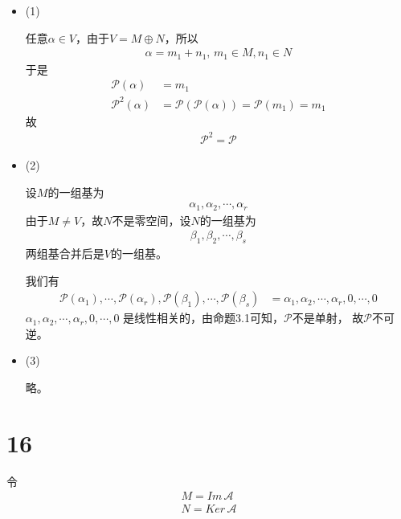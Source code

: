 \documentclass{article}
\begin{document}
\begin{itemize}
  \item (1)

        任意$\alpha \in V$，由于$V = M \oplus N$，所以
        \begin{align*}
          \alpha = m_1 + n_1 , \, m_1 \in M, n_1 \in N
        \end{align*}
        于是
        \begin{align*}
          \mathscr{P}(\alpha)   & = m_1                                                       \\
          \mathscr{P}^2(\alpha) & = \mathscr{P}(\mathscr{P}(\alpha)) = \mathscr{P}(m_1) = m_1
        \end{align*}
        故
        \begin{align*}
          \mathscr{P}^2 = \mathscr{P}
        \end{align*}

  \item (2)

        设$M$的一组基为
        \begin{align*}
          \alpha_1, \alpha_2, \cdots, \alpha_r
        \end{align*}
        由于$M \neq V$，故$N$不是零空间，设$N$的一组基为
        \begin{align*}
          \beta_1, \beta_2, \cdots, \beta_s
        \end{align*}
        两组基合并后是$V$的一组基。

        我们有
        \begin{align*}
          \mathscr{P}(\alpha_1), \cdots, \mathscr{P}(\alpha_r), \mathscr{P}(\beta_1), \cdots, \mathscr{P}(\beta_s)
           & = \alpha_1, \alpha_2, \cdots, \alpha_r, 0, \cdots, 0
        \end{align*}
        $\alpha_1, \alpha_2, \cdots, \alpha_r, 0, \cdots, 0$
        是线性相关的，由命题3.1可知，$\mathscr{P}$不是单射，
        故$\mathscr{P}$不可逆。

  \item (3)

        略。
\end{itemize}

\section*{16}

令
\begin{align*}
  M = Im\, \mathscr{A} \\
  N = Ker\, \mathscr{A}
\end{align*}
\end{document}
